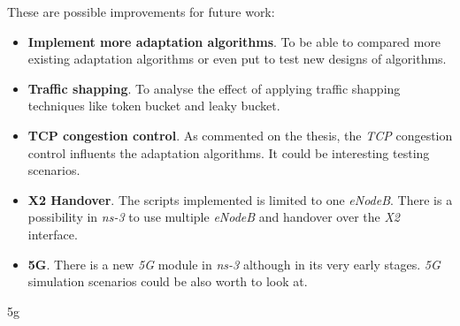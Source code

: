 These are possible improvements for future work:

\begin{itemize}
  \item \textbf{Implement more adaptation algorithms}. To be able to compared more existing
  adaptation algorithms or even put to test new designs of algorithms.
  \item \textbf{Traffic shapping}. To analyse the effect of applying traffic shapping techniques 
  like token bucket and leaky bucket.
  \item \textbf{TCP congestion control}. As commented on the thesis, the \textit{TCP} congestion 
  control influents the adaptation algorithms. It could be interesting testing scenarios.
  \item \textbf{X2 Handover}. The scripts implemented is limited to one \textit{eNodeB}. There 
  is a possibility in \textit{ns-3} to use multiple \textit{eNodeB} and handover over the \textit{X2}
  interface.
  \item \textbf{5G}. There is a new \textit{5G} module in \textit{ns-3} although in its very 
  early stages. \textit{5G} simulation scenarios could be also worth to look at.
\end{itemize}


5g